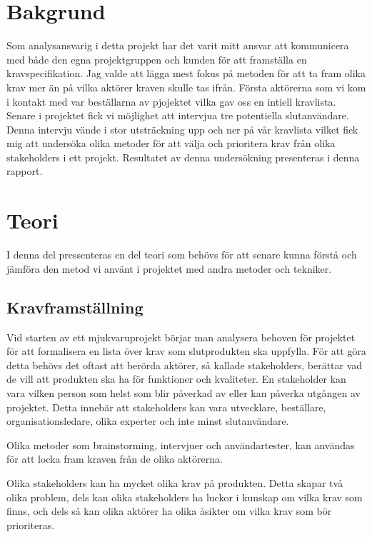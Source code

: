 \section{Bakgrund}
Som analysansvarig i detta projekt har det varit mitt ansvar att kommunicera med både den egna projektgruppen och kunden för att framställa en kravspecifikation. Jag valde att lägga mest fokus på metoden för att ta fram olika krav mer än på vilka aktörer kraven skulle tas ifrån. Första aktörerna som vi kom i kontakt med var beställarna av pjojektet vilka gav oss en intiell kravlista. Senare i projektet fick vi möjlighet att intervjua tre potentiella slutanvändare. Denna intervju vände i stor utsträckning upp och ner på vår kravlista vilket fick mig att undersöka olika metoder för att välja och prioritera krav från olika stakeholders i ett projekt. Resultatet av denna undersökning presenteras i denna rapport.  

\section{Teori}
I denna del pressenteras en del teori som behövs för att senare kunna förstå och jämföra den metod vi använt i projektet med andra metoder och tekniker.

\subsection{Kravframställning}
Vid starten av ett mjukvaruprojekt börjar man analysera behoven för projektet för att formalisera en lista över krav som slutprodukten ska uppfylla. För att göra detta behövs det oftast att berörda aktörer, så kallade stakeholders, berättar vad de vill att produkten ska ha för funktioner och kvaliteter. En stakeholder kan vara vilken person som helst som blir påverkad av eller kan påverka utgången av projektet. Detta innebär att stakeholders kan vara  utvecklare, beställare, organisationsledare, olika experter och inte minst slutanvändare. 

Olika metoder som brainstorming, intervjuer och användartester, kan användas för att locka fram kraven från de olika aktörerna.

Olika stakeholders kan ha mycket olika krav på produkten. Detta skapar två olika problem, dels kan olika stakeholders ha luckor i kunskap om vilka krav som finns, och dels så kan olika aktörer ha olika åsikter om vilka krav som bör prioriteras. 

